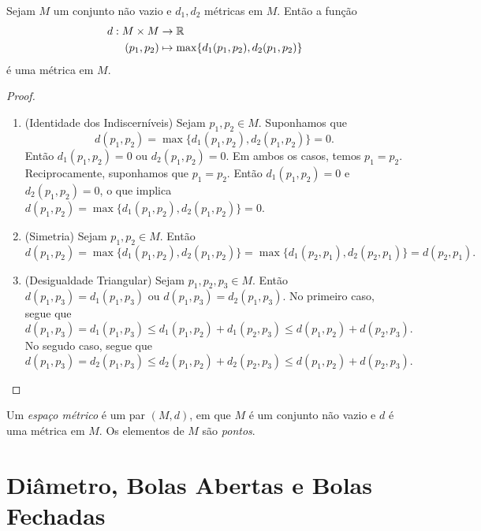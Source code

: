 \begin{prop}
	Sejam $M$ um conjunto não vazio e $d_1,d_2$ métricas em $M$. Então a função
	\begin{align*}
	d: M \times M &\to \mathbb{R} \\
	 (p_1,p_2) &\mapsto \max\{d_1(p_1,p_2),d_2(p_1,p_2)\}
	\end{align*}
é uma métrica em $M$.
\end{prop}
\begin{proof}
	\begin{enumerate}
	\item (Identidade dos Indiscerníveis) Sejam $p_1,p_2 \in M$. Suponhamos que
	\begin{equation*}
	d(p_1,p_2)=\max\{d_1(p_1,p_2),d_2(p_1,p_2)\}=0.
	\end{equation*}
Então $d_1(p_1,p_2)=0$ ou $d_2(p_1,p_2)=0$. Em ambos os casos, temos $p_1=p_2$. Reciprocamente, suponhamos que $p_1=p_2$. Então $d_1(p_1,p_2)=0$ e $d_2(p_1,p_2)=0$, o que implica $d(p_1,p_2)=\max\{d_1(p_1,p_2),d_2(p_1,p_2)\}=0$.
	
	\item (Simetria) Sejam $p_1,p_2 \in M$. Então
	\begin{equation*}
	d(p_1,p_2) = \max\{d_1(p_1,p_2),d_2(p_1,p_2)\} = \max\{d_1(p_2,p_1),d_2(p_2,p_1)\} = d(p_2,p_1).
	\end{equation*}
	
	\item (Desigualdade Triangular) Sejam $p_1,p_2,p_3 \in M$. Então $d(p_1,p_3)=d_1(p_1,p_3)$ ou $d(p_1,p_3)=d_2(p_1,p_3)$. No primeiro caso, segue que
	\begin{equation*}
	d(p_1,p_3) = d_1(p_1,p_3) \leq d_1(p_1,p_2) + d_1(p_2,p_3) \leq d(p_1,p_2) + d(p_2,p_3).
	\end{equation*}
	No segudo caso, segue que
	\begin{equation*}
	d(p_1,p_3) = d_2(p_1,p_3) \leq d_2(p_1,p_2) + d_2(p_2,p_3) \leq d(p_1,p_2) + d(p_2,p_3).
	\end{equation*}
	\end{enumerate}
\end{proof}

\begin{defi}
	Um \emph{espaço métrico} é um par $(M,d)$, em que $M$ é um conjunto não vazio e $d$ é uma métrica em $M$. Os elementos de $M$ são \emph{pontos}.
\end{defi}



\section{Diâmetro, Bolas Abertas e Bolas Fechadas}

